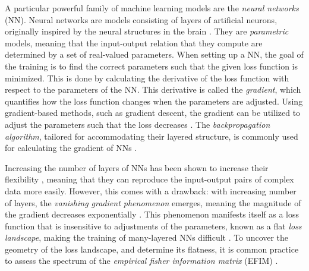 A particular powerful family of machine learning models are the \emph{neural networks} (NN). Neural networks are models consisting of layers of artificial neurons, originally inspired by the neural structures in the brain \cite{hands-on}. They are \emph{parametric} models, meaning that the input-output relation that they compute are determined by a set of real-valued parameters. When setting up a NN, the goal of the training is to find the correct parameters such that the given loss function is minimized. This is done by calculating the derivative of the loss function with respect to the parameters of the NN. This derivative is called the \emph{gradient}, which quantifies how the loss function changes when the parameters are adjusted. Using gradient-based methods, such as gradient descent, the gradient can be utilized to adjust the parameters such that the loss decreases \cite{hands-on}. The \emph{backpropagation algorithm}, tailored for accommodating their layered structure, is commonly used for calculating the gradient of NNs \cite{hands-on}. 

Increasing the number of layers of NNs has been shown to increase their flexibility \cite{raghu2017expressive}, meaning that they can reproduce the input-output pairs of complex data more easily. However, this comes with a drawback: with increasing number of layers, the \emph{vanishing gradient phenomenon} emerges, meaning the magnitude of the gradient decreases exponentially \cite{LeCun2012}. This phenomenon manifests itself as a loss function that is insensitive to adjustments of the parameters, known as a flat \emph{loss landscape}, making the training of many-layered NNs difficult \cite{karakida2019universal}. To uncover the geometry of the loss landscape, and determine its flatness, it is common practice to assess the spectrum of the \emph{empirical fisher information matrix} (EFIM) \cite{karakida2019universal}.


